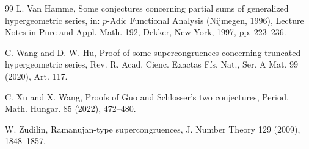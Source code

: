 \documentclass[12pt]{article}
\numberwithin{equation}{section}
\begin{document}
\begin{thebibliography}{99}
    L. Van Hamme, Some conjectures concerning partial sums of generalized hypergeometric series, 
    in: $p$-Adic Functional Analysis (Nijmegen, 1996), Lecture Notes in Pure and Appl. Math. 
    192, Dekker, New York, 1997, pp. 223--236.

    C. Wang and D.-W. Hu, Proof of some supercongruences concerning truncated hypergeometric series,
    Rev. R. Acad. Cienc. Exactas F\'is. Nat., Ser. A Mat. 99 (2020), Art. 117.



    





    C. Xu and X. Wang, Proofs of Guo and Schlosser's two conjectures, 
    Period. Math. Hungar. 85 (2022), 472--480.
   
    W. Zudilin, Ramanujan-type supercongruences, 
    J. Number Theory 129 (2009), 1848--1857.
    



    \end{thebibliography}
\end{document}
